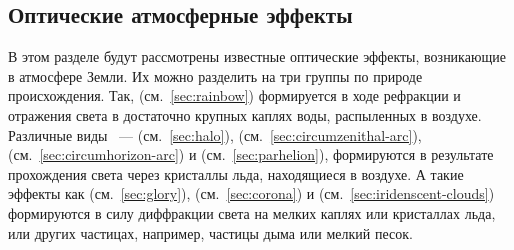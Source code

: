 \subsection{Оптические атмосферные эффекты}

В этом разделе будут рассмотрены известные оптические эффекты, возникающие в атмосфере Земли. Их можно разделить на три группы по природе происхождения. Так,  (см.~\ref{sec:rainbow}) формируется в ходе рефракции и отражения света в достаточно крупных каплях воды, распыленных в воздухе. Различные виды ~---  (см.~\ref{sec:halo}),  (см.~\ref{sec:circumzenithal-arc}),  (см.~\ref{sec:circumhorizon-arc}) и  (см.~\ref{sec:parhelion}), формируются в результате прохождения света через кристаллы льда, находящиеся в воздухе. А такие эффекты как  (см.~\ref{sec:glory}),  (см.~\ref{sec:corona}) и  (см.~\ref{sec:iridenscent-clouds}) формируются в силу  диффракции света на мелких каплях или кристаллах льда, или других частицах, например, частицы дыма или мелкий песок.








